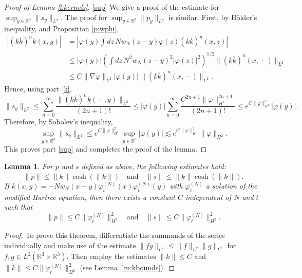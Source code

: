 \documentclass[11pt,a4paper]{scrartcl}
\newtheorem{lem}[thm]{Lemma}
\newcommand{\R}{\mathds{R}}
\newcommand{\Rbb}{\mathbb{R}}		%
\newcommand{\norm}[1]{\lVert#1\rVert}	%
\newcommand{\ph}{\varphi_t^{(N)}}	%
\newcommand{\bd}{\begin{displaymath}}			%
\newcommand{\ed}{\end{displaymath}}
\begin{document}
\begin{proof}[Proof of Lemma \ref{l:kernels}]
  \ref{sup} We give a proof of the estimate for $\sup_{y \in \R^3} \| s_y
  \|_{L^2}$. The proof for $\sup_{y \in \R^3} \| p_y \|_{L^2}$ is similar.
  First, by H\"older's inequality, and Proposition \ref{p:wphi},
  \begin{align*}
    |(k \overline{k})^n k(x,y)| & = \left| \varphi(y) \int dz \, N w_N(z-y)
    \varphi(z) (k \overline{k})^n(x,z) \right| \\
    & \le |\varphi(y)| \left( \int dz \, N^2 w_N(z-y)^2 |\varphi(z)|^2
    \right)^{1/2} \| (k \overline{k})^n(x,\, \cdot\,) \|_{L^2} \\
    & \le C \| \nabla \varphi \|_{L^2} | \varphi(y)| \, \| (k \overline{k}
    )^n(x,\, \cdot\,) \|_{L^2}.
  \end{align*}
  Hence, using part \ref{k},
  \[
    \| s_y \|_{L^2} \le \sum_{n=0}^\infty \frac{\| (k \overline{k})^n k(\,
    \cdot\,,y) \|_{L^2}}{(2n+1)!} \le |\varphi(y)| \sum_{n=0}^\infty
    \frac{C^{2n+1} \| \varphi \|_{H^1}^{2n+1}}{(2n+1)!} \le e^{C \|
    \varphi\|_{H^1}^2} |\varphi(y)|.
  \]
  Therefore, by Sobolev's inequality,
  \[
    \sup_{y \in \R^3} \| s_y \|_{L^2} \le e^{C \| \varphi \|_{H^1}^2} \sup_{y
    \in \R^3} |\varphi(y)| \apprle e^{C \| \varphi \|_{H^1}^2} \| \varphi
    \|_{H^2}.
  \]
  This proves part \ref{sup} and completes the proof of the lemma.
\end{proof}

\begin{lem}
 For $p$ and $s$ defined as above, the following estimates hold:
\bd
\norm{\dot p} \leq \norm{\dot k} \cosh(\norm{k}) \quad \mbox{and} \quad \norm{\dot s} \leq \norm{\dot k} \cosh(\norm{k}).
\ed
If $k(x,y) = - N w_N(x-y) \ph(x) \ph(y)$ with $\ph$ a solution of the modified Hartree equation, then there exists a constant $C$ independent of $N$ and $t$ such that
\bd
\norm{\dot p} \leq C \norm{\ph}_{H^2}^2 \quad \mbox{and} \quad \norm{\dot s} \leq C \norm{\ph}_{H^2}^2.
\ed
\end{lem}
\begin{proof}
 To prove this theorem, differentiate the summands of the series individually and make use of the estimate $\norm{fg}_{L^2} \leq \norm{f}_{L^2} \norm{g}_{L^2}$ for $f,g \in L^2(\Rbb^3\times \Rbb^3)$. Then employ the estimates $\norm{k} \leq C$ and $\norm{\dot k} \leq C \norm{\ph}_{H^2}^2$ (see Lemma \ref{lm:kbounds}).
\end{proof}
\end{document}
